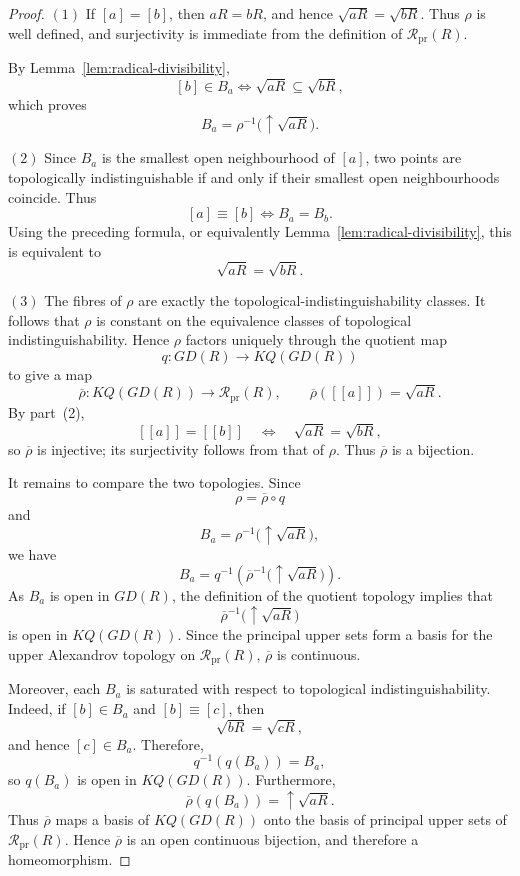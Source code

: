 \documentclass[11pt]{amsart}
\theoremstyle{plain}
\theoremstyle{definition}
\theoremstyle{remark}
\numberwithin{equation}{section}
\begin{document}
\begin{proof}
	$(1)$ If $[a]=[b]$, then $aR=bR$, and hence
	$\sqrt{aR}=\sqrt{bR}$. Thus $\rho$ is well defined, and surjectivity is
	immediate from the definition of $\mathcal R_{\mathrm{pr}}(R)$.
	
	By Lemma~\ref{lem:radical-divisibility},
	\[
	[b]\in B_a
	\Longleftrightarrow
	\sqrt{aR}\subseteq\sqrt{bR},
	\]
	which proves
	\[
	B_a=\rho^{-1}\bigl(\uparrow\sqrt{aR}\bigr).
	\]
	
	$(2)$ Since $B_a$ is the smallest open neighbourhood of $[a]$, two points are
	topologically indistinguishable if and only if their smallest open
	neighbourhoods coincide. Thus
	\[
	[a]\equiv[b]
	\Longleftrightarrow
	B_a=B_b.
	\]
	Using the preceding formula, or equivalently
	Lemma~\ref{lem:radical-divisibility}, this is equivalent to
	\[
	\sqrt{aR}=\sqrt{bR}.
	\]
	
	
	$(3)$ The fibres of $\rho$ are exactly the topological-indistinguishability
	classes. It follows that $\rho$ is constant on the equivalence classes of
	topological indistinguishability. Hence $\rho$ factors uniquely through
	the quotient map
	\[
	q:GD(R)\longrightarrow KQ(GD(R))
	\]
	to give a map
	\[
	\overline{\rho}:KQ(GD(R))
	\longrightarrow
	\mathcal R_{\mathrm{pr}}(R),
	\qquad
	\overline{\rho}([[a]])=\sqrt{aR}.
	\]
	By part~(2),
	\[
	[[a]]=[[b]]
	\quad\Longleftrightarrow\quad
	\sqrt{aR}=\sqrt{bR},
	\]
	so $\overline{\rho}$ is injective; its surjectivity follows from that of
	$\rho$. Thus $\overline{\rho}$ is a bijection.
	
	It remains to compare the two topologies. Since
	\[
	\rho=\overline{\rho}\circ q
	\]
	and
	\[
	B_a=\rho^{-1}\bigl(\uparrow\sqrt{aR}\bigr),
	\]
	we have
	\[
	B_a
	=
	q^{-1}\!\left(
	\overline{\rho}^{-1}
	\bigl(\uparrow\sqrt{aR}\bigr)
	\right).
	\]
	As $B_a$ is open in $GD(R)$, the definition of the quotient topology
	implies that
	\[
	\overline{\rho}^{-1}
	\bigl(\uparrow\sqrt{aR}\bigr)
	\]
	is open in $KQ(GD(R))$. Since the principal upper sets form a basis for
	the upper Alexandrov topology on $\mathcal R_{\mathrm{pr}}(R)$,
	$\overline{\rho}$ is continuous.
	
	Moreover, each $B_a$ is saturated with respect to topological
	indistinguishability. Indeed, if $[b]\in B_a$ and $[b]\equiv[c]$, then
	\[
	\sqrt{bR}=\sqrt{cR},
	\]
	and hence $[c]\in B_a$. Therefore,
	\[
	q^{-1}(q(B_a))=B_a,
	\]
	so $q(B_a)$ is open in $KQ(GD(R))$. Furthermore,
	\[
	\overline{\rho}(q(B_a))
	=
	\uparrow\sqrt{aR}.
	\]
	Thus $\overline{\rho}$ maps a basis of $KQ(GD(R))$ onto the basis of
	principal upper sets of $\mathcal R_{\mathrm{pr}}(R)$. Hence
	$\overline{\rho}$ is an open continuous bijection, and therefore a
	homeomorphism.
\end{proof}
\end{document}
